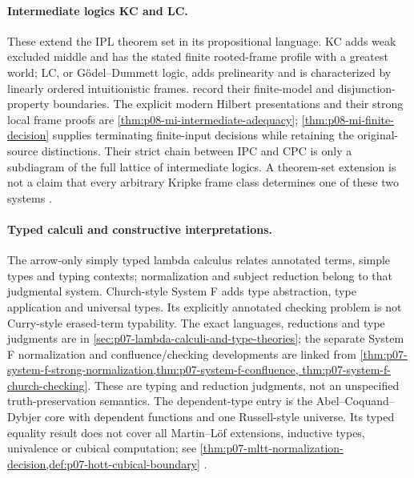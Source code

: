 \paragraph{Intermediate logics KC and LC.}
\label{entry:p14-directory-intermediate}
These extend the IPL theorem set in its propositional language. KC adds
weak excluded middle and has the stated finite rooted-frame profile with
a greatest world; LC, or G\"odel--Dummett logic, adds prelinearity and
is characterized by linearly ordered intuitionistic frames.
record their finite-model and disjunction-property boundaries.
The explicit modern Hilbert presentations and their strong local
frame proofs are \cref{thm:p08-mi-intermediate-adequacy};
\cref{thm:p08-mi-finite-decision} supplies terminating finite-input
decisions while retaining the original-source distinctions.
Their strict chain between IPC and CPC is only a subdiagram of the full
lattice of intermediate logics. A theorem-set extension is not a claim
that every arbitrary Kripke frame class determines one of these two systems
\cite{Jankov1968WeakExcludedMiddle,Dummett1959,ChagrovZakharyaschev1997}.

\paragraph{Typed calculi and constructive interpretations.}
\label{entry:p14-directory-typed}
The arrow-only simply typed lambda calculus relates annotated terms,
simple types and typing contexts; normalization and subject reduction
belong to that judgmental system. Church-style System F adds type
abstraction, type application and universal types. Its explicitly annotated
checking problem is not Curry-style erased-term typability. The exact
languages, reductions and type judgments are in
\cref{sec:p07-lambda-calculi-and-type-theories}; the separate System F
normalization and confluence/checking developments are linked from
\cref{thm:p07-system-f-strong-normalization,thm:p07-system-f-confluence,
thm:p07-system-f-church-checking}. These are typing and reduction judgments,
not an unspecified truth-preservation semantics. The dependent-type entry
is the Abel--Coquand--Dybjer core with dependent functions and one
Russell-style universe. Its typed equality result does not cover all
Martin--L\"of extensions, inductive types, univalence or cubical computation;
see \cref{thm:p07-mltt-normalization-decision,def:p07-hott-cubical-boundary}
\cite{GirardLafontTaylor1989,AbelCoquandDybjer2007}.

